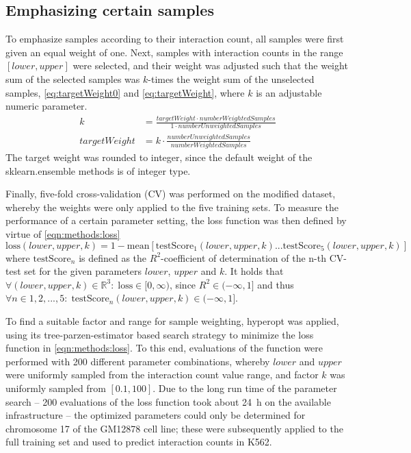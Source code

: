 \subsection{Emphasizing certain samples} \label{sec:methods:emphasizing}
To emphasize samples according to their interaction count, 
all samples were first given an equal weight of one.
Next, samples with interaction counts in the range $[lower, upper]$ were selected,
and their weight was adjusted such that the weight sum of the selected samples
was $k$-times the weight sum of the unselected samples, \autoref{eq:targetWeight0} and \ref{eq:targetWeight},
where $k$ is an adjustable numeric parameter.
\bgroup
 \small
\begin{align}
 k &= \frac{targetWeight \cdot numberWeightedSamples}{1 \cdot numberUnweightedSamples} \label{eq:targetWeight0}\\ 
 targetWeight &= k \cdot \frac{numberUnweightedSamples}{numberWeightedSamples} \label{eq:targetWeight}
\end{align} \egroup
The target weight was rounded to integer, 
since the default weight of the sklearn.ensemble methods is of integer type.

Finally, five-fold cross-validation (CV) was performed on the modified dataset,
whereby the weights were only applied to the five training sets.
To measure the performance of a certain parameter setting, the loss function was then defined by virtue of \autoref{eqn:methods:loss}
\bgroup
\small
\begin{equation} \label{eqn:methods:loss}
 \textrm{loss}(lower,upper,k) = 1 - \textrm{mean}[\textrm{testScore}_1(lower,upper,k)...\textrm{testScore}_5(lower,upper,k)]
\end{equation} \egroup
where $\textrm{testScore}_n$ is defined as the $R^2$-coefficient of determination of the n-th CV-test set for the given
parameters $lower$, $upper$ and $k$.
It holds that $\forall (lower,upper,k) \in \mathbb{R}^3:\; \textrm{loss} \in [0,\infty)$, 
since $R^2 \in (-\infty,1]$ and thus 
$\forall n \in 1,2,...,5:\; \textrm{testScore}_n(lower,upper,k) \in (-\infty,1]$.

To find a suitable factor and range for sample weighting, hyperopt \cite{Bergstra2011} was applied, 
using its tree-parzen-estimator based search strategy to minimize the loss function in \autoref{eqn:methods:loss}.
To this end, evaluations of the function were performed with 200 different parameter combinations,
whereby $lower$ and $upper$ were uniformly sampled from the interaction count value range,
and factor $k$ was uniformly sampled from $[0.1, 100]$.
Due to the long run time of the parameter search -- 200 evaluations of the loss function
took about \SI{24}{\hour} on the available infrastructure -- the optimized 
parameters could only be determined 
for chromosome 17 of the GM12878 cell line; 
these were subsequently applied to the full training set and used to predict interaction counts in K562.

